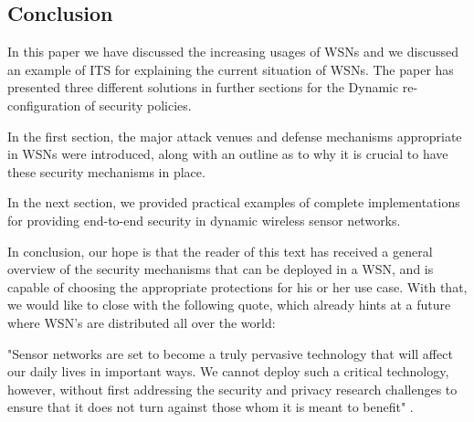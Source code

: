 \documentclass[12pt,a4paper,twoside]{report}
\begin{document}
\subsection{Conclusion}
In this paper we have discussed the increasing usages of WSNs and we discussed an example of ITS for explaining the current situation of WSNs. The paper has presented three different solutions in further sections for the Dynamic re-configuration of security policies.\par
In the first section, the major attack venues and defense mechanisms appropriate in WSNs were introduced, along with an outline as to why it is crucial to have these security mechanisms in place. \par
In the next section, we provided practical examples of complete implementations for providing end-to-end security in dynamic wireless sensor networks.\par
In conclusion, our hope is that the reader of this text has received a general overview of the security mechanisms that can be deployed in a WSN, and is capable of choosing the appropriate protections for his or her use case. With that, we would like to close with the following quote, which already hints at a future where WSN's are distributed all over the world: \par
"Sensor networks are set to become a truly pervasive technology that will affect our daily lives in important ways. We cannot deploy such a critical technology, however, without first addressing the security and privacy research challenges to ensure that it does not turn against those whom it is meant to benefit" \cite{chan;perrig:2003}.\par


\iffalse
\end{document}
